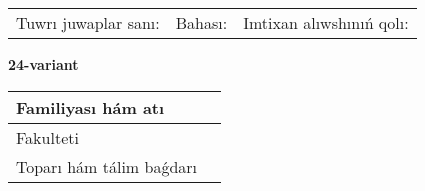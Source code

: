 \documentclass{article}
\begin{document}
\vspace{1cm}

\begin{tabular}{lll}
Tuwrı juwaplar sanı: \underline{\hspace{1.5cm}} & 
Bahası: \underline{\hspace{1.5cm}} & 
Imtixan alıwshınıń qolı: \underline{\hspace{2cm}} \\
\end{tabular}

\egroup

\newpage


\textbf{24-variant}\\

\bgroup
\def\arraystretch{1.6} %

\begin{tabular}{|m{5.7cm}|m{9.5cm}|}
\hline
Familiyası hám atı & \\
\hline
Fakulteti  & \\
\hline
Toparı hám tálim baǵdarı  & \\
\hline
\end{tabular}

\vspace{1cm}
\end{document}
